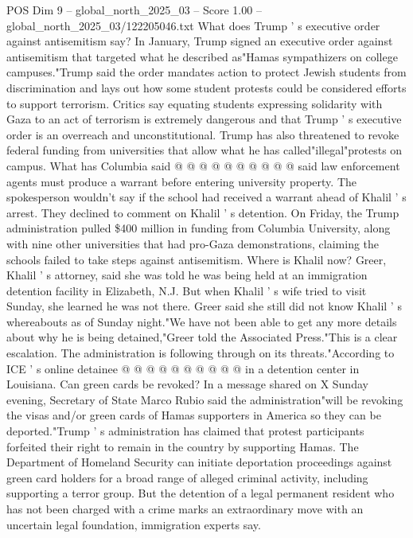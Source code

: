 \begin{textsample}{POS Dim 9 – global\_north\_2025\_03 – Score 1.00 – global\_north\_2025\_03/122205046.txt}
What does Trump ' s executive order against antisemitism say?
In January, Trump signed an executive order against antisemitism that targeted what he described as"Hamas sympathizers on college campuses."Trump said the order mandates action to protect Jewish students from discrimination and lays out how some student protests could be considered efforts to support terrorism.
Critics say equating students expressing solidarity with Gaza to an act of terrorism is extremely dangerous and that Trump ' s executive order is an overreach and unconstitutional.
Trump has also threatened to revoke federal funding from universities that allow what he has called"illegal"protests on campus.
What has Columbia said @ @ @ @ @ @ @ @ @ @ said law enforcement agents must produce a warrant before entering university property.
The spokesperson wouldn't say if the school had received a warrant ahead of Khalil ' s arrest.
They declined to comment on Khalil ' s detention.
On Friday, the Trump administration pulled \$400 million in funding from Columbia University, along with nine other universities that had pro-Gaza demonstrations, claiming the schools failed to take steps against antisemitism.
Where is Khalil now?
Greer, Khalil ' s attorney, said she was told he was being held at an immigration detention facility in Elizabeth, N.J.
But when Khalil ' s wife tried to visit Sunday, she learned he was not there.
Greer said she still did not know Khalil ' s whereabouts as of Sunday night."We have not been able to get any more details about why he is being detained,"Greer told the Associated Press."This is a clear escalation.
The administration is following through on its threats."According to ICE ' s online detainee @ @ @ @ @ @ @ @ @ @ in a detention center in Louisiana.
Can green cards be revoked?
In a message shared on X Sunday evening, Secretary of State Marco Rubio said the administration"will be revoking the visas and/or green cards of Hamas supporters in America so they can be deported."Trump ' s administration has claimed that protest participants forfeited their right to remain in the country by supporting Hamas.
The Department of Homeland Security can initiate deportation proceedings against green card holders for a broad range of alleged criminal activity, including supporting a terror group.
But the detention of a legal permanent resident who has not been charged with a crime marks an extraordinary move with an uncertain legal foundation, immigration experts say.

\end{textsample}
